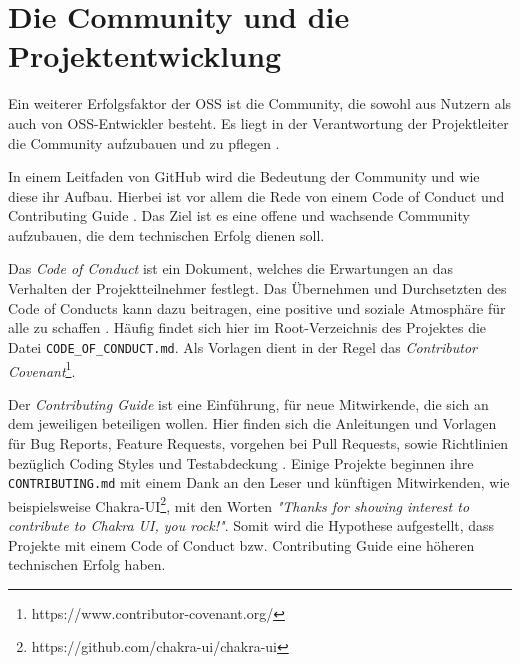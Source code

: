 \section{Die Community und die Projektentwicklung}\label{sec:community}



Ein weiterer Erfolgsfaktor der OSS ist die Community, die sowohl aus Nutzern als auch von OSS-Entwickler besteht. 
Es liegt in der Verantwortung der Projektleiter die Community aufzubauen und zu pflegen 
\cite{bangerthWhatMakesComputational2013,GitHubBuildingWelcomingCommunities2022}.


In einem Leitfaden von GitHub wird die Bedeutung der Community und wie diese ihr Aufbau. Hierbei
ist vor allem die Rede von einem Code of Conduct und Contributing Guide
\cite{GitHubBuildingWelcomingCommunities2022}. Das Ziel ist es eine offene und wachsende Community
aufzubauen, die dem technischen Erfolg dienen soll.



Das \textit{Code of Conduct} ist ein Dokument, welches die Erwartungen an das Verhalten der Projektteilnehmer
festlegt. Das Übernehmen und Durchsetzten des Code of Conducts kann dazu beitragen, eine positive
und soziale Atmosphäre für alle zu schaffen \cite{GitHubYourCodeOfConduct2022}. %
Häufig findet sich hier im Root-Verzeichnis des Projektes die Datei \texttt{CODE\_OF\_CONDUCT.md}.
Als Vorlagen dient in der Regel das \textit{Contributor Covenant}\footnote{https://www.contributor-covenant.org/}.


Der \textit{Contributing Guide} ist eine Einführung, für neue Mitwirkende,
die sich an dem jeweiligen beteiligen wollen. Hier finden sich die Anleitungen und Vorlagen für
Bug Reports, Feature Requests, vorgehen bei Pull Requests, sowie Richtlinien bezüglich
Coding Styles und Testabdeckung \cite{GitHubStartingAProject2022}. %
Einige Projekte beginnen ihre \texttt{CONTRIBUTING.md} mit einem Dank an den Leser und künftigen
Mitwirkenden, wie beispielsweise Chakra-UI\footnote{https://github.com/chakra-ui/chakra-ui},
mit den Worten
\textit{"Thanks for showing interest to contribute to Chakra UI, you rock!"}.
Somit wird die Hypothese aufgestellt, dass Projekte mit einem Code of Conduct bzw. Contributing
Guide eine höheren technischen Erfolg haben.

